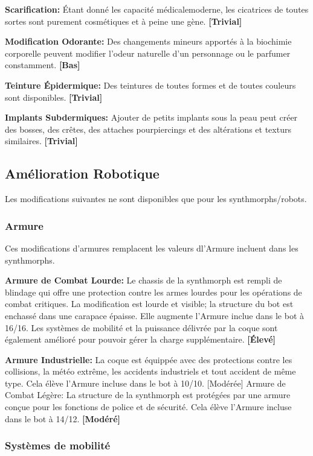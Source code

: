 \textbf{Scarification:} Étant donné les capacité médicalemoderne, les cicatrices de toutes sortes sont purement cosmétiques et à peine une gène. \textbf{[Trivial]} 

\textbf{Modification Odorante:} Des changements mineurs apportés à la biochimie corporelle peuvent modifier l'odeur naturelle d'un personnage ou le parfumer constamment. \textbf{[Bas]} 

\textbf{Teinture Épidermique:} Des teintures de toutes formes et de toutes couleurs sont disponibles. \textbf{[Trivial]} 

\textbf{Implants Subdermiques:} Ajouter de petits implants sous la peau peut créer des bosses, des crêtes, des attaches pourpiercings et des altérations et texturs similaires. \textbf{[Trivial]} 

\subsection{Amélioration Robotique} \label{sec:robotic-enhancements} 

Les modifications suivantes ne sont disponibles que pour les synthmorphs/robots. 

\subsubsection{Armure} 

Ces modifications d'armures remplacent les valeurs dl'Armure incluent dans les synthmorphs. 

\textbf{Armure de Combat Lourde:} Le chassis de la synthmorph est rempli de blindage qui offre une protection contre les armes lourdes pour les opérations de combat critiques. La modification est lourde et visible; la structure du bot est enchassé dans une carapace épaisse. Elle augmente l'Armure inclue dans le bot à 16/16. Les systèmes de mobilité et la puissance délivrée par la coque sont également amélioré pour pouvoir gérer la charge supplémentaire. \textbf{[Élevé]} 

\textbf{Armure Industrielle:} La coque est équippée avec des protections contre les collisions, la météo extrême, les accidents industriels et tout accident de même type. Cela élève l'Armure incluse dans le bot à 10/10. [Modérée] Armure de Combat Légère: La structure de la synthmorph est protégées par une armure conçue pour les fonctions de police et de sécurité. Cela élève l'Armure incluse dans le bot à 14/12. \textbf{[Modéré]} 

\subsubsection{Systèmes de mobilité} 

